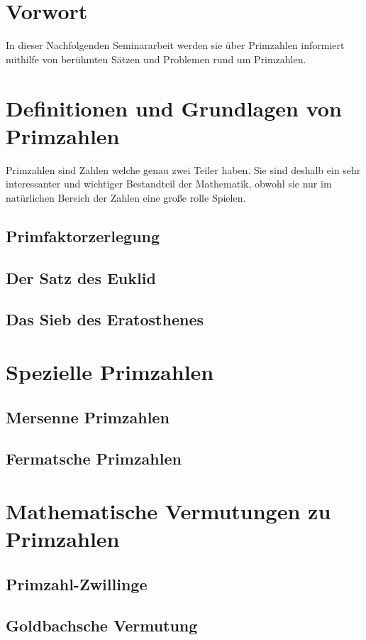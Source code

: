 \documentclass[11pt]{article}
\begin{document}
\tableofcontents
\newpage
\section*{Vorwort}
In dieser Nachfolgenden Seminararbeit werden sie über Primzahlen informiert mithilfe von
berühmten Sätzen und Problemen rund um Primzahlen.
\newpage
\section{Definitionen und Grundlagen von Primzahlen}
Primzahlen sind Zahlen welche genau zwei Teiler haben. Sie sind deshalb ein sehr interessanter und wichtiger Bestandteil der Mathematik, obwohl sie nur im natürlichen Bereich der Zahlen eine große rolle Spielen.
\subsection{Primfaktorzerlegung}
\subsection{Der Satz des Euklid}
\subsection{Das Sieb des Eratosthenes}
\section{Spezielle Primzahlen}
\subsection{Mersenne Primzahlen}
\subsection{Fermatsche Primzahlen}
\section{Mathematische Vermutungen zu Primzahlen}
\subsection{Primzahl-Zwillinge}
\subsection{Goldbachsche Vermutung}
\end{document}
